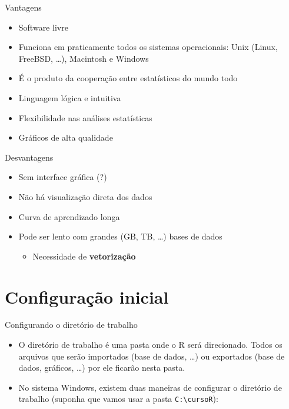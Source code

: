\documentclass[10pt,handout]{beamer}\usepackage[]{graphicx}\usepackage[]{color}
\begin{document}
\begin{frame}{Vantagens}
\begin{itemize}
\item Software livre
\item Funciona em praticamente todos os sistemas operacionais: Unix
  (Linux, FreeBSD, \ldots), Macintosh e Windows
\item É o produto da cooperação entre estatísticos do mundo todo
\item Linguagem lógica e intuitiva
\item Flexibilidade nas análises estatísticas
\item Gráficos de alta qualidade
\end{itemize}
\end{frame}

\begin{frame}{Desvantagens}
\begin{itemize}
\item Sem interface gráfica (?)
\item Não há visualização direta dos dados
\item Curva de aprendizado longa
\item Pode ser lento com grandes (GB, TB, \ldots) bases de dados
  \begin{itemize}
  \item Necessidade de \textbf{vetorização}
  \end{itemize}
\end{itemize}
\end{frame}

\section{Configuração inicial}

\begin{frame}[fragile]{Configurando o diretório de trabalho}
\begin{itemize}
\item O diretório de trabalho é uma pasta onde o R será
  direcionado. Todos os arquivos que serão importados (base de dados,
  \ldots) ou exportados (base de dados, gráficos, \ldots) por ele
  ficarão nesta pasta.
\item No sistema Windows, existem duas maneiras de configurar o
  diretório de trabalho (suponha que vamos usar a pasta
  \verb|C:\cursoR|):
\end{itemize}
\end{frame}
\end{document}
